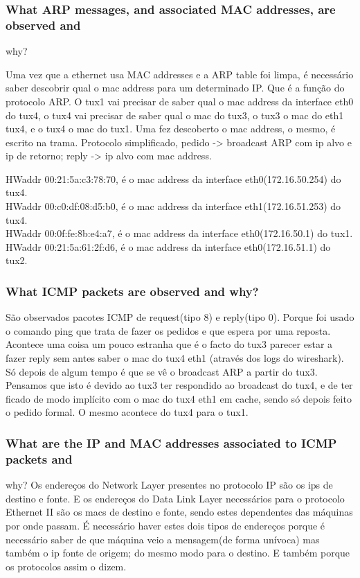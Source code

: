 \documentclass[a4paper]{article}
\begin{document}
\subsubsection{What ARP messages, and associated MAC addresses, are observed and}
why?

Uma vez que a ethernet usa MAC addresses e a ARP table foi limpa, é necessário saber descobrir qual o mac address para um determinado IP. Que é a função do protocolo ARP. O tux1 vai precisar de saber qual o mac address da interface eth0 do tux4, o tux4 vai precisar de saber qual o mac do tux3, o tux3 o mac do eth1 tux4, e o tux4 o mac do tux1. Uma fez descoberto o mac address, o mesmo, é escrito na trama. Protocolo simplificado, pedido -> broadcast ARP com ip alvo e ip de retorno; reply -> ip alvo com mac address.\\\newline

\noindent HWaddr 00:21:5a:c3:78:70, é o mac address da interface eth0(172.16.50.254) do tux4.\\
HWaddr 00:c0:df:08:d5:b0, é o mac address da interface eth1(172.16.51.253) do tux4.\\
HWaddr 00:0f:fe:8b:e4:a7, é o mac address da interface eth0(172.16.50.1) do tux1.\\
HWaddr 00:21:5a:61:2f:d6, é o mac address da interface eth0(172.16.51.1) do tux2.

\subsubsection{What ICMP packets are observed and why?}
São observados pacotes ICMP de request(tipo 8) e reply(tipo 0). Porque foi usado o comando ping que trata de fazer os pedidos e que espera por uma reposta. Acontece uma coisa um pouco estranha que é o facto do tux3 parecer estar a fazer reply sem antes saber o mac do tux4 eth1 (através dos logs do wireshark). Só depois de algum tempo é que se vê o broadcast ARP a partir do tux3. Pensamos que isto é devido ao tux3 ter respondido ao broadcast do tux4, e de ter ficado de modo implícito com o mac do tux4 eth1 em cache, sendo só depois feito o pedido formal. O mesmo acontece do tux4 para o tux1.

\subsubsection{What are the IP and MAC addresses associated to ICMP packets and}
why?
Os endereços do Network Layer presentes no protocolo IP são os ips de destino e fonte. E os endereços do Data Link Layer necessários para o protocolo Ethernet II são os macs de destino e fonte, sendo estes dependentes das máquinas por onde passam. É necessário haver estes dois tipos de endereços porque é necessário saber de que máquina veio a mensagem(de forma unívoca) mas também o ip fonte de origem; do mesmo modo para o destino. E também porque os protocolos assim o dizem.
\end{document}
